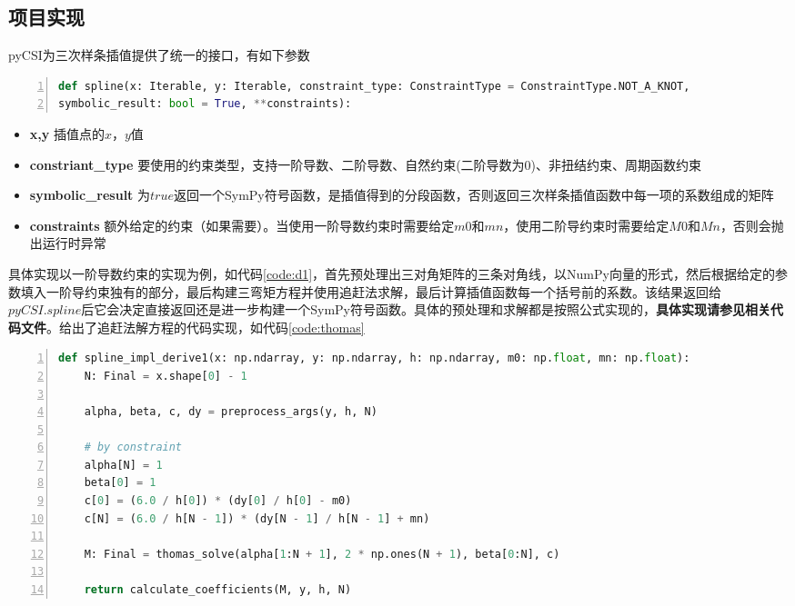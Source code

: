 \documentclass[a4paper,twoside]{article}
\begin{document}
\begin{spacing}{1.2}
\section{项目实现}

pyCSI为三次样条插值提供了统一的接口，有如下参数
\begin{lstlisting}[language=Python,numbers=left,style=PythonStyle,label={code:interface}]
def spline(x: Iterable, y: Iterable, constraint_type: ConstraintType = ConstraintType.NOT_A_KNOT,
symbolic_result: bool = True, **constraints):
\end{lstlisting}

\begin{itemize}
	\item \textbf{x,y} 插值点的$x$，$y$值
	\item \textbf{constriant\_type} 要使用的约束类型，支持一阶导数、二阶导数、自然约束(二阶导数为0)、非扭结约束、周期函数约束
	\item \textbf{symbolic\_result} 为$true$返回一个SymPy符号函数，是插值得到的分段函数，否则返回三次样条插值函数中每一项的系数组成的矩阵
	\item \textbf{constraints} 额外给定的约束（如果需要）。当使用一阶导数约束时需要给定$m0$和$mn$，使用二阶导约束时需要给定$M0$和$Mn$，否则会抛出运行时异常
\end{itemize}

具体实现以一阶导数约束的实现为例，如代码\ref{code:d1}，首先预处理出三对角矩阵的三条对角线，以NumPy向量的形式，然后根据给定的参数填入一阶导约束独有的部分，最后构建三弯矩方程并使用追赶法求解，最后计算插值函数每一个括号前的系数。该结果返回给$pyCSI.spline$后它会决定直接返回还是进一步构建一个SymPy符号函数。具体的预处理和求解都是按照公式实现的，\textbf{具体实现请参见相关代码文件}。给出了追赶法解方程的代码实现，如代码\ref{code:thomas}

\begin{lstlisting}[language=Python,numbers=left,style=PythonStyle,caption=一阶导数约束的实现,label={code:d1}]
def spline_impl_derive1(x: np.ndarray, y: np.ndarray, h: np.ndarray, m0: np.float, mn: np.float):
	N: Final = x.shape[0] - 1
	
	alpha, beta, c, dy = preprocess_args(y, h, N)
	
	# by constraint
	alpha[N] = 1
	beta[0] = 1
	c[0] = (6.0 / h[0]) * (dy[0] / h[0] - m0)
	c[N] = (6.0 / h[N - 1]) * (dy[N - 1] / h[N - 1] + mn)
	
	M: Final = thomas_solve(alpha[1:N + 1], 2 * np.ones(N + 1), beta[0:N], c)

	return calculate_coefficients(M, y, h, N)
\end{lstlisting}




\end{spacing}
\end{document}
